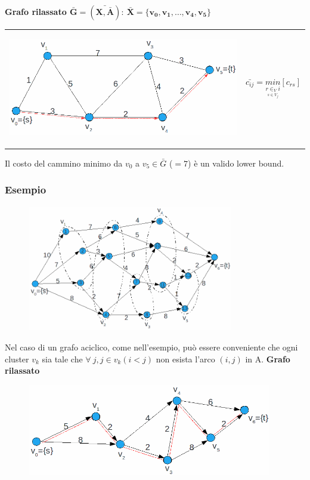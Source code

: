 \clearpage
\textbf{Grafo rilassato $\boldsymbol{\bar{G}=(\bar{X,\bar{A}}):\ \bar{X}=\{v_{0},v_{1},\dots,v_{4},v_{5}\}}$}
\begin{table}[!h]
	\begin{tabular}{m{11cm} m{5cm}}
		\includegraphics[height=5cm]{images/graph43.png} & \begin{equation*}
			\bar{c_{ij}}=\underset{\underset{s\in V_{j}}{r\in _V{i}}}{min}[c_{rs}]
		\end{equation*}
	\end{tabular}
\end{table}

Il costo del cammino minimo da $v_{0}$ a $v_{5}\in\bar{G}$ ($ =7$) è un valido lower bound.

\subsubsection{Esempio}
\begin{figure}[!h]
	\centering
	\includegraphics[height=5.5cm]{images/graph44.png}
\end{figure}
Nel caso di un grafo aciclico, come nell'esempio, può essere conveniente che ogni cluster $v_{k}$ sia tale che $\forall\ j,j\in v_{k}(i<j)$ non esista l'arco $(i,j)$ in A.\newline\newline
\textbf{Grafo rilassato}\\
\begin{figure}[H]
	\centering
	\includegraphics[height=4cm]{images/graph45.png}
\end{figure}

